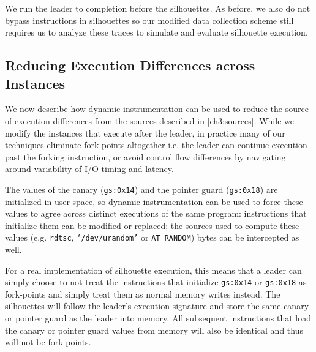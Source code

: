 We run the leader to completion before the silhouettes.
As before, we also do not bypass instructions in silhouettes
so our modified data collection scheme still requires us
to analyze these traces to simulate and evaluate
silhouette execution.

\subsection{Reducing Execution Differences across Instances}
We now describe how dynamic instrumentation can be used to reduce
the source of execution differences from the sources described in \ref{ch3:sources}.
While we modify
the instances that execute after the leader, 
in practice many of our techniques eliminate fork-points altogether 
i.e. the leader can continue execution past
the forking instruction,
or avoid control flow differences by navigating
around variability of I/O timing and latency. \newline


 \newline
The values of the canary (\texttt{gs:0x14}) and the pointer guard (\texttt{gs:0x18})
are initialized in user-space, so dynamic instrumentation can be used to force 
these values to agree across distinct executions of the same program:
instructions that initialize them can be
modified or replaced; the sources used to compute
these values (e.g. \texttt{rdtsc}, \texttt{`/dev/urandom'}
or \texttt{AT\_RANDOM}) bytes
can be intercepted as well.

For a real implementation of silhouette execution, this means that a leader can simply choose to
not treat the instructions that initialize \texttt{gs:0x14} or
\texttt{gs:0x18} as fork-points and simply
treat them as normal memory writes instead. The silhouettes will follow the 
leader's execution signature and store the same canary or pointer guard
as the leader into memory. All subsequent instructions
that load the canary or pointer guard values 
from memory will also be identical and thus
will not be fork-points. 
\newline


